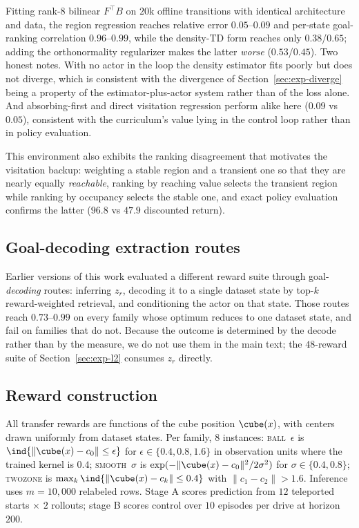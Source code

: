 Fitting rank-$8$ bilinear $F^{\top}B$ on $20$k offline transitions with identical
architecture and data, the region regression reaches relative error
$0.05$--$0.09$ and per-state goal-ranking correlation $0.96$--$0.99$, while the
density-TD form reaches only $0.38$/$0.65$; adding the orthonormality regularizer
makes the latter \emph{worse} ($0.53$/$0.45$). Two honest notes. With no actor in
the loop the density estimator fits poorly but does not diverge, which is
consistent with the divergence of Section~\ref{sec:exp-diverge} being a property
of the estimator-plus-actor system rather than of the loss alone. And
absorbing-first and direct visitation regression perform alike here
($0.09$ vs $0.05$), consistent with the curriculum's value lying in the control
loop rather than in policy evaluation.

This environment also exhibits the ranking disagreement that motivates the
visitation backup: weighting a stable region and a transient one so that they are
nearly equally \emph{reachable}, ranking by reaching value selects the transient
region while ranking by occupancy selects the stable one, and exact policy
evaluation confirms the latter ($96.8$ vs $47.9$ discounted return).

\subsection{Goal-decoding extraction routes}
\label{app:decode}

Earlier versions of this work evaluated a different reward suite through
goal-\emph{decoding} routes: inferring $z_r$, decoding it to a single dataset
state by top-$k$ reward-weighted retrieval, and conditioning the actor on that
state. Those routes reach $0.73$--$0.99$ on every family whose optimum reduces to
one dataset state, and fail on families that do not. Because the outcome is
determined by the decode rather than by the measure, we do not use them in the
main text; the $48$-reward suite of Section~\ref{sec:exp-l2} consumes $z_r$
directly.

\subsection{Reward construction}
\label{app:rewards}

All transfer rewards are functions of the cube position $\cube(x)$, with centers
drawn uniformly from dataset states. Per family, $8$ instances:
\textsc{ball}~$\epsilon$ is $\ind{\|\cube(x)-c_0\|\le\epsilon}$ for
$\epsilon\in\{0.4,0.8,1.6\}$ in observation units where the trained kernel is
$0.4$; \textsc{smooth}~$\sigma$ is $\exp(-\|\cube(x)-c_0\|^2/2\sigma^2)$ for
$\sigma\in\{0.4,0.8\}$; \textsc{twozone} is
$\max_k\ind{\|\cube(x)-c_k\|\le 0.4}$ with $\|c_1-c_2\|>1.6$. Inference uses
$m{=}10{,}000$ relabeled rows. Stage A scores prediction from $12$ teleported
starts $\times$ $2$ rollouts; stage B scores control over $10$ episodes per drive
at horizon $200$.

